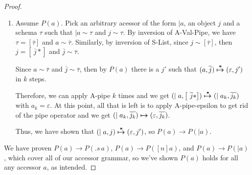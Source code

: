 \documentclass[11pt]{article}
\newcommand{\jarr}[1]{\left[#1\right]}   %
\newcommand{\matches}[2]{{#1}\sim{#2}}   %
\newcommand{\aeps}{\varepsilon}          %
\newcommand{\akey}[2]{.{#1}\,{#2}}       %
\newcommand{\apipe}[1]{\mid {#1}}        %
\begin{document}
\begin{proof}
\begin{enumerate}
\item Assume $P(a)$. Pick an arbitrary acessor of the form $\apipe{a}$, an object
$j$ and a schema $\tau$ such that $\matches{\apipe{a}}{\tau}$ and $\matches{j}{\tau}$.
By inversion of A-Val-Pipe, we have $\tau = \jarr{\overline{\tau}}$ and 
$\matches{a}{\overline{\tau}}$. Similarly, by inversion of S-List, since 
$\matches{j}{\jarr{\overline{\tau}}}$, then $j = \jarr{~\overline{j}*}$ and
$\matches{\overline{j}}{\overline{\tau}}$. 

Since $\matches{a}{\overline{\tau}}$ and $\matches{\overline{j}}{\overline{\tau}}$, then 
by $P(a)$ there is a $j'$ such that $\evals{(a, \overline{j})}{(\aeps, j')}$ in $k$ steps.

Therefore, we can apply A-pipe $k$ times and we get 
$\evals{(\apipe{a}, \jarr{~\overline{j}*})}{(\apipe{a_k}, \overline{j_k})}$ with 
$a_k = \aeps$. At this point, all that is left is to apply A-pipe-epsilon to get rid of the pipe operator and we get 
$\steps{(\apipe{a_k}, \overline{j_k})}{(\aeps, \overline{j_k})}$.

Thus, we have shown that
$\evals{(\apipe{a}, j)}{(\aeps, j')}$, so $P(a) \rightarrow P(\apipe{a})$.
\end{enumerate}{}

We have proven $P(a) \rightarrow P(\akey{s}{a})$, 
$P(a) \rightarrow P(\jarr{n}a)$, and $P(a) \rightarrow P(\apipe{a})$, which cover all
of our accessor grammar, so we've shown $P(a)$ holds for all any accessor $a$, as
intended.

\end{proof}
\end{document}
